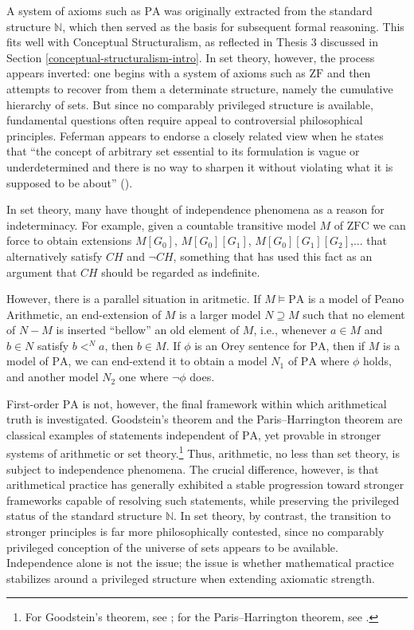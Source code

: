 \documentclass[11pt,a4paper]{book}
\theoremstyle{plain}
\begin{document}
A system of axioms such as \(\mathrm{PA}\) was originally extracted from the standard structure \(\mathbb{N}\), which then served as the basis for subsequent formal reasoning. This fits well with Conceptual Structuralism, as reflected in Thesis 3 discussed in Section \ref{conceptual-structuralism-intro}. In set theory, however, the process appears inverted: one begins with a system of axioms such as \(\mathrm{ZF}\) and then attempts to recover from them a determinate structure, namely the cumulative hierarchy of sets. But since no comparably privileged structure is available, fundamental questions often require appeal to controversial philosophical principles. Feferman appears to endorse a closely related view when he states that ``the concept of arbitrary set essential to its formulation is vague or underdetermined and there is no way to sharpen it without violating what it is supposed to be about'' (\textcite[p.~1]{Feferman2011a}).

In set theory, many have thought of independence phenomena as a reason for indeterminacy. For example, given a countable transitive model $M$ of $\mathrm{ZFC}$ we can force to obtain extensions $M[G_0]$, $M[G_0][G_1]$, $M[G_0][G_1][G_2]$,... that alternatively satisfy $CH$ and $\neg CH$, something that \textcite{Hamkins2012Multiverse} has used this fact as an argument that $CH$ should be regarded as indefinite. 

However, there is \textcite[513]{Koellner2016} a parallel situation in aritmetic. If $M \models \mathrm{PA}$ is a model of Peano Arithmetic, an end-extension of $M$ is a larger model $N \supseteq M$ such that no element of $N - M$ is inserted ``bellow'' an old element of $M$, i.e., whenever $a \in M$ and $b \in N$ satisfy $b <^N a $, then $b \in M$. If $\phi$ is an Orey sentence for $\mathrm{PA}$, then if $M$ is a model of $\mathrm{PA}$, we can end-extend it to obtain a model $N_1$ of $\mathrm{PA}$ where $\phi $ holds, and another model $N_2$ one where $\neg \phi$ does. 

First-order \(\mathrm{PA}\) is not, however, the final framework within which arithmetical truth is investigated. Goodstein's theorem and the Paris--Harrington theorem are classical examples of statements independent of \(\mathrm{PA}\), yet provable in stronger systems of arithmetic or set theory.\footnote{For Goodstein's theorem, see \textcite{KirbyParis1982}; for the Paris--Harrington theorem, see \textcite{ParisHarrington1977}.} Thus, arithmetic, no less than set theory, is subject to independence phenomena. The crucial difference, however, is that arithmetical practice has generally exhibited a stable progression toward stronger frameworks capable of resolving such statements, while preserving the privileged status of the standard structure \(\mathbb{N}\). In set theory, by contrast, the transition to stronger principles is far more philosophically contested, since no comparably privileged conception of the universe of sets appears to be available. Independence alone is not the issue; the issue is whether mathematical practice stabilizes around a privileged structure when extending axiomatic strength.
\end{document}
